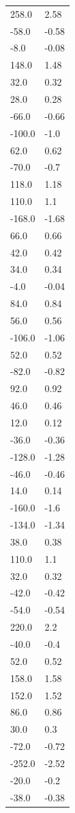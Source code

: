 \begin{longtable}{ll}
258.0 & 2.58 \\
-58.0 & -0.58 \\
-8.0 & -0.08 \\
148.0 & 1.48 \\
32.0 & 0.32 \\
28.0 & 0.28 \\
-66.0 & -0.66 \\
-100.0 & -1.0 \\
62.0 & 0.62 \\
-70.0 & -0.7 \\
118.0 & 1.18 \\
110.0 & 1.1 \\
-168.0 & -1.68 \\
66.0 & 0.66 \\
42.0 & 0.42 \\
34.0 & 0.34 \\
-4.0 & -0.04 \\
84.0 & 0.84 \\
56.0 & 0.56 \\
-106.0 & -1.06 \\
52.0 & 0.52 \\
-82.0 & -0.82 \\
92.0 & 0.92 \\
46.0 & 0.46 \\
12.0 & 0.12 \\
-36.0 & -0.36 \\
-128.0 & -1.28 \\
-46.0 & -0.46 \\
14.0 & 0.14 \\
-160.0 & -1.6 \\
-134.0 & -1.34 \\
38.0 & 0.38 \\
110.0 & 1.1 \\
32.0 & 0.32 \\
-42.0 & -0.42 \\
-54.0 & -0.54 \\
220.0 & 2.2 \\
-40.0 & -0.4 \\
52.0 & 0.52 \\
158.0 & 1.58 \\
152.0 & 1.52 \\
86.0 & 0.86 \\
30.0 & 0.3 \\
-72.0 & -0.72 \\
-252.0 & -2.52 \\
-20.0 & -0.2 \\
-38.0 & -0.38 \\

\end{longtable}
